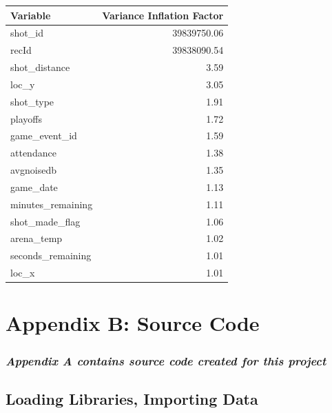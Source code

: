 \documentclass[american,]{article}
\begin{document}
\begin{table}[H]
\centering
\begin{tabular}{lr}
\toprule
Variable & Variance Inflation Factor\\
\midrule
\rowcolor{gray!6}  shot\_id & 39839750.06\\
recId & 39838090.54\\
\rowcolor{gray!6}  shot\_distance & 3.59\\
loc\_y & 3.05\\
\rowcolor{gray!6}  shot\_type & 1.91\\
\addlinespace
playoffs & 1.72\\
\rowcolor{gray!6}  game\_event\_id & 1.59\\
attendance & 1.38\\
\rowcolor{gray!6}  avgnoisedb & 1.35\\
game\_date & 1.13\\
\addlinespace
\rowcolor{gray!6}  minutes\_remaining & 1.11\\
shot\_made\_flag & 1.06\\
\rowcolor{gray!6}  arena\_temp & 1.02\\
seconds\_remaining & 1.01\\
\rowcolor{gray!6}  loc\_x & 1.01\\
\bottomrule
\end{tabular}
\end{table}

\newpage

\hypertarget{appendix-b-source-code}{%
\section{Appendix B: Source Code}\label{appendix-b-source-code}}

\hypertarget{appendix-a-contains-source-code-created-for-this-project}{%
\subsubsection{\texorpdfstring{\emph{Appendix A contains source code created for this project}}{Appendix A contains source code created for this project}}\label{appendix-a-contains-source-code-created-for-this-project}}

\hypertarget{loading-libraries-importing-data}{%
\subsection{Loading Libraries, Importing Data}\label{loading-libraries-importing-data}}
\end{document}
